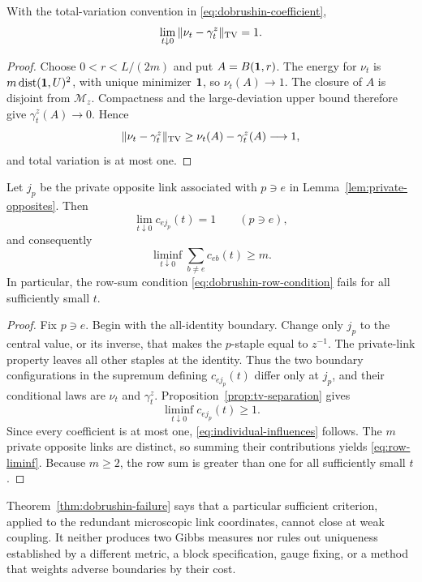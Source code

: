 \begin{proposition}
\label{prop:tv-separation}
With the total-variation convention in
\eqref{eq:dobrushin-coefficient},
\begin{equation}\label{eq:tv-limit}
  \lim_{t\downarrow0}\|\nu_t-\gamma_t^z\|_{\mathrm{TV}}=1.
\end{equation}
\end{proposition}

\begin{proof}
Choose $0<r<L/(2m)$ and put $A=B(\mathbf 1,r)$.  The energy for $\nu_t$ is
$m\operatorname{dist}(\mathbf 1,U)^2$, with unique minimizer $\mathbf 1$, so
$\nu_t(A)\to1$.  The closure of $A$ is disjoint from $\mathcal M_z$.
Compactness and the large-deviation upper bound therefore give
$\gamma_t^z(A)\to0$.  Hence
\[
 \|\nu_t-\gamma_t^z\|_{\mathrm{TV}}
 \geq \nu_t(A)-\gamma_t^z(A)\longrightarrow1,
\]
and total variation is at most one.
\end{proof}

\begin{theorem}
\label{thm:dobrushin-failure}
Let $j_p$ be the private opposite link associated with $p\ni e$ in
Lemma~\ref{lem:private-opposites}.  Then
\begin{equation}\label{eq:individual-influences}
  \lim_{t\downarrow0}c_{e j_p}(t)=1
  \qquad(p\ni e),
\end{equation}
and consequently
\begin{equation}\label{eq:row-liminf}
  \liminf_{t\downarrow0}\sum_{b\neq e}c_{eb}(t)\geq m.
\end{equation}
In particular, the row-sum condition \eqref{eq:dobrushin-row-condition}
fails for all sufficiently small $t$.
\end{theorem}

\begin{proof}
Fix $p\ni e$.  Begin with the all-identity boundary.  Change only $j_p$ to
the central value, or its inverse, that makes the $p$-staple equal to
$z^{-1}$.  The private-link property leaves all other staples at the
identity.  Thus the two boundary configurations in the supremum defining
$c_{e j_p}(t)$ differ only at $j_p$, and their conditional laws are $\nu_t$
and $\gamma_t^z$.  Proposition~\ref{prop:tv-separation} gives
\[
 \liminf_{t\downarrow0}c_{e j_p}(t)\geq1.
\]
Since every coefficient is at most one, \eqref{eq:individual-influences}
follows.  The $m$ private opposite links are distinct, so summing their
contributions yields \eqref{eq:row-liminf}.  Because $m\geq2$, the row sum is
greater than one for all sufficiently small $t$.
\end{proof}

\begin{remark}
Theorem~\ref{thm:dobrushin-failure} says that a particular sufficient
criterion, applied to the redundant microscopic link coordinates, cannot
close at weak coupling.  It neither produces two Gibbs measures nor rules out
uniqueness established by a different metric, a block specification, gauge
fixing, or a method that weights adverse boundaries by their cost.
\end{remark}
